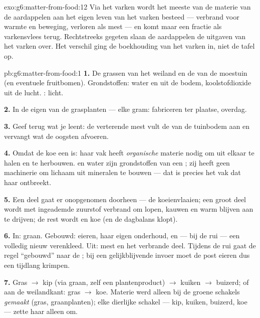 \begin{solution}{exo:g6:matter-from-food:12}
Via het varken wordt het meeste van de materie van de aardappelen aan het
eigen leven van het varken besteed --- verbrand voor warmte en beweging,
verloren als mest --- en komt maar een fractie als varkensvlees terug.
Rechtstreeks gegeten slaan de aardappelen de uitgaven van het varken
over. Het verschil ging de boekhouding van het varken in, niet de tafel op.
\end{solution}

\begin{solution}{pb:g6:matter-from-food:1}
\textbf{1.} De grassen van het weiland en de  van de moestuin (en
eventuele fruitbomen). Grondstoffen: water en  uit de
bodem, koolstofdioxide uit de lucht. : licht.

\textbf{2.} In de eigen  van de grasplanten --- elke gram:
 fabriceren ter plaatse, overdag.

\textbf{3.} Geef terug wat je leent: de verterende mest vult de  van de tuinbodem aan en vervangt wat de oogsten afvoeren.

\textbf{4.} Omdat de koe een  is: haar vak heeft
\emph{organische} materie nodig om uit elkaar te halen en te herbouwen.
 en water zijn grondstoffen van een ; zij heeft
geen machinerie om lichaam uit mineralen te bouwen --- dat is precies het
vak dat haar ontbreekt.

\textbf{5.} Een deel gaat er onopgenomen doorheen --- de koeienvlaaien;
een groot deel wordt met ingeademde zuurstof verbrand om lopen, kauwen en
warm blijven aan te drijven; de rest wordt  en koe (en de dagbalans
klopt).

\textbf{6.} In: graan. Gebouwd: eieren, haar eigen onderhoud, en --- bij
de rui --- een volledig nieuw verenkleed. Uit: mest en het verbrande
deel. Tijdens de rui gaat de regel ``gebouwd'' naar de ; bij een
gelijkblijvende invoer moet de post eieren dus een tijdlang krimpen.

\textbf{7.} Gras $\rightarrow$ kip (via graan, zelf een plantenproduct)
$\rightarrow$ kuiken $\rightarrow$ buizerd; of aan de weilandkant: gras
$\rightarrow$ koe. Materie werd alleen bij de groene schakels
\emph{gemaakt} (gras, graanplanten); elke dierlijke schakel --- kip,
kuiken, buizerd, koe --- zette haar alleen om.


\end{solution}
